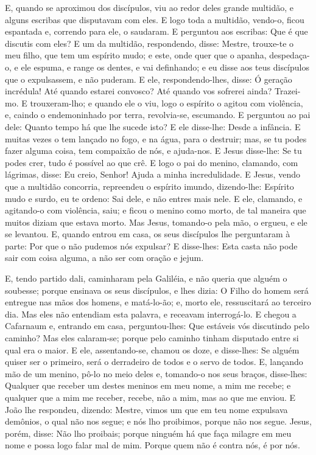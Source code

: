 E, quando se aproximou dos discípulos, viu ao redor deles grande
multidão, e alguns escribas que disputavam com eles. E logo
toda a multidão, vendo-o, ficou espantada e, correndo para ele, o
saudaram. E perguntou aos escribas: Que é que discutis com
eles? E um da multidão, respondendo, disse: Mestre, trouxe-te
o meu filho, que tem um espírito mudo; e este, onde quer que
o apanha, despedaça-o, e ele espuma, e range os dentes, e vai
definhando; e eu disse aos teus discípulos que o expulsassem, e não
puderam. E ele, respondendo-lhes, disse: Ó geração incrédula!
Até quando estarei convosco? Até quando vos sofrerei ainda?
Trazei-mo. E trouxeram-lho; e quando ele o viu, logo o
espírito o agitou com violência, e, caindo o endemoninhado por
terra, revolvia-se, escumando. E perguntou ao pai dele:
Quanto tempo há que lhe sucede isto? E ele disse-lhe: Desde a
infância. E muitas vezes o tem lançado no fogo, e na água,
para o destruir; mas, se tu podes fazer alguma coisa, tem compaixão
de nós, e ajuda-nos. E Jesus disse-lhe: Se tu podes crer,
tudo é possível ao que crê. E logo o pai do menino, clamando,
com lágrimas, disse: Eu creio, Senhor! Ajuda a minha incredulidade.
E Jesus, vendo que a multidão concorria, repreendeu o
espírito imundo, dizendo-lhe: Espírito mudo e surdo, eu te ordeno:
Sai dele, e não entres mais nele. E ele, clamando, e
agitando-o com violência, saiu; e ficou o menino como morto, de tal
maneira que muitos diziam que estava morto. Mas Jesus,
tomando-o pela mão, o ergueu, e ele se levantou. E, quando
entrou em casa, os seus discípulos lhe perguntaram à parte: Por que
o não pudemos nós expulsar? E disse-lhes: Esta casta não pode
sair com coisa alguma, a não ser com oração e jejum.

E, tendo partido dali, caminharam pela Galiléia, e não queria que
alguém o soubesse; porque ensinava os seus discípulos, e lhes
dizia: O Filho do homem será entregue nas mãos dos homens, e
matá-lo-ão; e, morto ele, ressuscitará ao terceiro dia. Mas
eles não entendiam esta palavra, e receavam interrogá-lo. E
chegou a Cafarnaum e, entrando em casa, perguntou-lhes: Que estáveis
vós discutindo pelo caminho? Mas eles calaram-se; porque pelo
caminho tinham disputado entre si qual era o maior. E ele,
assentando-se, chamou os doze, e disse-lhes: Se alguém quiser ser o
primeiro, será o derradeiro de todos e o servo de todos. E,
lançando mão de um menino, pô-lo no meio deles e, tomando-o nos seus
braços, disse-lhes: Qualquer que receber um destes meninos em
meu nome, a mim me recebe; e qualquer que a mim me receber, recebe,
não a mim, mas ao que me enviou. E João lhe respondeu,
dizendo: Mestre, vimos um que em teu nome expulsava demônios, o qual
não nos segue; e nós lho proibimos, porque não nos segue.
Jesus, porém, disse: Não lho proibais; porque ninguém há que
faça milagre em meu nome e possa logo falar mal de mim.
Porque quem não é contra nós, é por nós.

